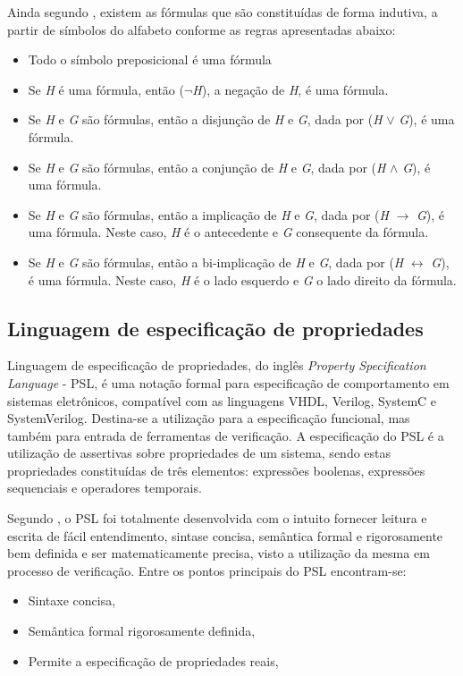 Ainda segundo \citeauthor{souza2017logica}, existem as fórmulas que são constituídas de forma indutiva, a partir de símbolos do alfabeto conforme as regras apresentadas abaixo:
\begin{itemize}
\item Todo o símbolo preposicional é uma fórmula
\item Se \textit{H} é uma fórmula, então ($\neg$\textit{H}), a negação de \textit{H}, é uma fórmula.
\item Se \textit{H} e \textit{G} são fórmulas, então a disjunção de \textit{H} e \textit{G}, dada por (\textit{H} $\lor$ \textit{G}), é uma fórmula.
\item Se \textit{H} e \textit{G} são fórmulas, então a conjunção de \textit{H} e \textit{G}, dada por (\textit{H} $\land$ \textit{G}), é uma fórmula.
\item Se \textit{H} e \textit{G} são fórmulas, então a implicação de \textit{H} e \textit{G}, dada por (\textit{H} $\rightarrow$ \textit{G}), é uma fórmula. Neste caso, \textit{H} é o antecedente e \textit{G} consequente da fórmula.
\item Se \textit{H} e \textit{G} são fórmulas, então a bi-implicação de \textit{H} e \textit{G}, dada por (\textit{H} $\leftrightarrow$ \textit{G}), é uma fórmula. Neste caso, \textit{H} é o lado esquerdo e \textit{G} o lado direito da fórmula.
\end{itemize}


\subsection{Linguagem de especificação de propriedades}
Linguagem de especificação de propriedades, do inglês \textit{Property Specification Language} - PSL, é uma notação formal para especificação de comportamento em sistemas eletrônicos, compatível com as linguagens VHDL, Verilog, SystemC e SystemVerilog. Destina-se a utilização para a especificação funcional, mas também para entrada de ferramentas de verificação. A especificação do PSL é a utilização de assertivas sobre propriedades de um sistema, sendo estas propriedades constituídas de três elementos: expressões boolenas, expressões sequenciais e operadores temporais\cite{IEEEPSL}.

\par
Segundo \cite{IEEEPSL}, o PSL foi totalmente desenvolvida com o intuito fornecer leitura e escrita de fácil entendimento, sintase concisa, semântica formal e rigorosamente bem definida e ser matematicamente precisa, visto a utilização da mesma em processo de verificação. Entre os pontos principais do PSL encontram-se:
\begin{itemize}
\item Sintaxe concisa,
\item Semântica formal rigorosamente definida,
\item Permite a especificação de propriedades reais,
\end{itemize}

